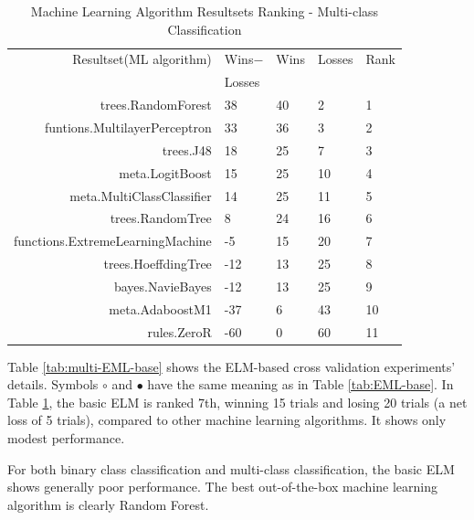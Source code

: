 \documentclass[a4paper, 14pt]{extarticle}
\begin{document}
\begin{table}[thb]
\caption{\label{tab:multiRank}Machine Learning Algorithm Resultsets Ranking  - Multi-class Classification}
\footnotesize
{\centering \begin{tabular}{rllll}\\
\hline
Resultset(ML algorithm) & Wins$-$ & Wins & Losses & Rank\\
& Losses & & &\\
\hline
trees.RandomForest &  38 &  40 &   2 & 1\\
funtions.MultilayerPerceptron &  33 &  36 &   3 & 2\\
trees.J48 &  18 &  25 &   7 & 3\\
meta.LogitBoost &  15 &  25 &  10 & 4\\
meta.MultiClassClassifier &  14 &  25 &  11 & 5\\
trees.RandomTree&   8 &  24 &  16 & 6\\
functions.ExtremeLearningMachine &  -5 &  15 &  20 & 7\\
trees.HoeffdingTree & -12 &  13 &  25 & 8\\
bayes.NavieBayes & -12 &  13 &  25 & 9\\
meta.AdaboostM1 & -37 &   6 &  43 & 10\\
rules.ZeroR & -60 &   0 &  60 & 11\\
\hline
\end{tabular} \footnotesize \par}
\end{table} 
Table \ref{tab:multi-EML-base} shows the ELM-based cross validation experiments' details. Symbols $\circ$ and $\bullet$ have the same meaning as in Table \ref{tab:EML-base}. In Table \ref{tab:multiRank},  the basic ELM is ranked 7th, winning 15 trials and losing 20 trials (a net loss of 5 trials), compared to other machine learning algorithms. It shows only modest performance. 
\par For both binary class classification and multi-class classification, the basic ELM shows generally poor performance. The best out-of-the-box machine learning algorithm is clearly Random Forest.  
\end{document}
